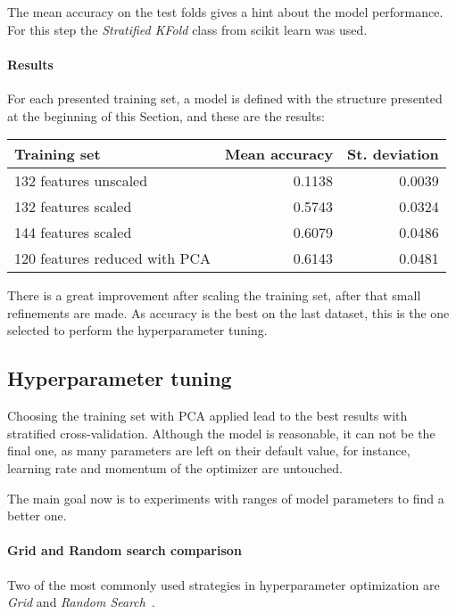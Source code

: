 The mean accuracy on the test folds gives a hint about the model performance.
For this step the \emph{Stratified KFold} class from scikit learn was used.~\cite{cross-scikit}

\paragraph{Results}
For each presented training set, a model is defined 
with the structure presented at the beginning of this Section, 
and these are the results:

\begin{center}
    \begin{tabular}{ |l|r|r| } 
        \hline
        Training set & Mean accuracy & St. deviation \\
        \hline
        132 features unscaled &  0.1138 & 0.0039 \\
        132 features scaled &  0.5743 & 0.0324 \\
        144 features scaled &  0.6079 & 0.0486 \\
        120 features reduced with PCA &  0.6143 & 0.0481 \\
        \hline
    \end{tabular}
\end{center}

There is a great improvement after scaling the training set, after 
that small refinements are made.
As accuracy is the best on the last dataset, this is the one selected to 
perform the hyperparameter tuning.

\subsection{Hyperparameter tuning}

Choosing the training set with PCA applied lead to the best results 
with stratified cross-validation. Although the model is reasonable, 
it can not be the final one, as many parameters are left on their default value, 
for instance, learning rate and momentum of the optimizer are untouched. 

The main goal now is to experiments with ranges of model parameters 
to find a better one.

\paragraph{Grid and Random search comparison}
Two of the most commonly used strategies in hyperparameter optimization
are \emph{Grid} and \emph{Random Search}~\cite{random-grid}. 

